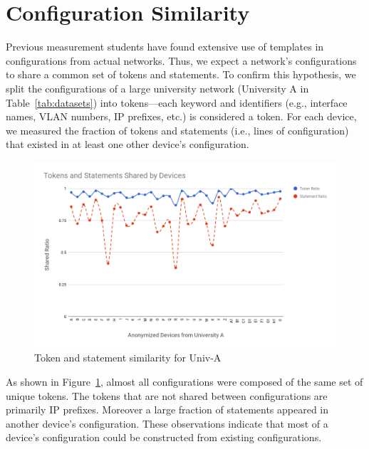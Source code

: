 \section{Configuration Similarity}
\label{sec:similarity}

Previous measurement students have found extensive use of templates in
configurations from actual networks. Thus, we expect a network's
configurations to share a common set of tokens and statements. To confirm this
hypothesis, we split the configurations of a large university network
(University A in Table~\ref{tab:datasets}) into tokens---each keyword and
identifiers (e.g., interface names, VLAN numbers, IP prefixes, etc.) is
considered a token. For each device, we measured the fraction of
tokens and statements (i.e., lines of configuration) that existed in at least
one other device's configuration.

\begin{figure}
	\centering
	\includegraphics[width=\columnwidth]{chart.png}
	\caption{Token and statement similarity for Univ-A}
    \vspace{-2em}
    \label{fig:chart}
\end{figure}

As shown in Figure~\ref{fig:chart}, almost all configurations were composed of
the same set of unique tokens. The tokens that are not shared between
configurations are primarily IP prefixes. Moreover a large fraction of
statements appeared in another device's configuration. These observations
indicate that most of a device's configuration could be constructed from
existing configurations.
